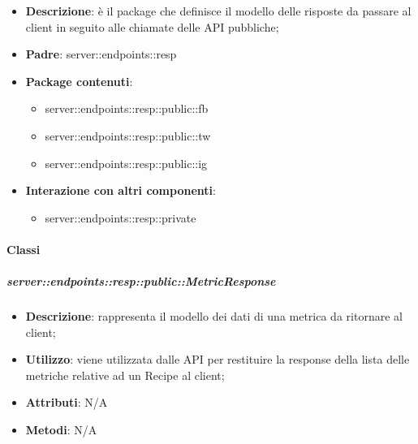 \begin{itemize}
  \item \textbf{Descrizione}: è il package che definisce il modello delle risposte da passare al client in seguito alle chiamate delle API pubbliche;
  \item \textbf{Padre}: server::endpoints::resp
  \item \textbf{Package contenuti}:
  	\begin{itemize}
  		\item server::endpoints::resp::public::fb
  		\item server::endpoints::resp::public::tw
  		\item server::endpoints::resp::public::ig
	\end{itemize}
  \item \textbf{Interazione con altri componenti}:
  	\begin{itemize}
  		\item server::endpoints::resp::private
	\end{itemize}
\end{itemize}

  \paragraph{Classi}

    \subparagraph{server::endpoints::resp::public::MetricResponse} %
    \label{subp:bdsm_app_server_endpoints_resp_public_metricresponse}
    \begin{itemize}
      \item \textbf{Descrizione}: rappresenta il modello dei dati di una metrica da ritornare al client;
      \item \textbf{Utilizzo}: viene utilizzata dalle API per restituire la response della lista delle metriche relative ad un Recipe al client;
    \item \textbf{Attributi}: N/A
    \item \textbf{Metodi}: N/A
      \end{itemize}

